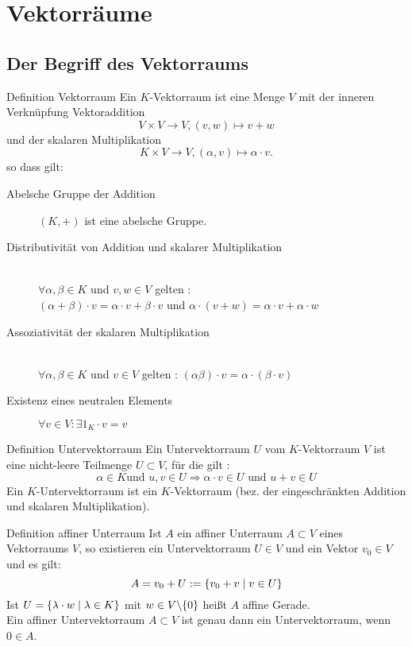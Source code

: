 \documentclass[main.tex]{subfiles}
\begin{document}
\section*{Vektorräume}
\subsection*{Der Begriff des Vektorraums}
\begin{karte}{Definition Vektorraum}
    Ein \( K \)-Vektorraum ist eine Menge \(V\) mit der inneren 
    Verknüpfung Vektoraddition 
    \[ V \times V \rightarrow V, (v,w) \mapsto v + w \]
    und der skalaren Multiplikation 
    \[ K \times V \rightarrow V, (\alpha, v) \mapsto 
    \alpha \cdot v. \]
    so dass gilt: 
    \begin{description}
        \item[Abelsche Gruppe der Addition]
        \( (K,+) \) ist eine abelsche Gruppe.  
        \item[Distributivität von Addition und skalarer Multiplikation] \hfill \\ 
        \( \forall \alpha, \beta \in K\) und \( v, w \in V\) gelten : \\
        \( (\alpha + \beta) \cdot v =  \alpha \cdot v + \beta \cdot v\)
        und 
        \( \alpha \cdot ( v + w) = \alpha \cdot v + \alpha \cdot w\)
        \item[Assoziativität der skalaren Multiplikation] \hfill \\
        \( \forall \alpha, \beta \in K\) und \( v \in V\) gelten :
        \((\alpha \beta) \cdot v = \alpha \cdot (\beta \cdot v)\)
        \item[Existenz eines neutralen Elements]
        \( \forall v \in V : \exists 1_K \cdot v = v\)
    \end{description}
\end{karte}
\begin{karte}{Definition Untervektorraum}
    Ein Untervektorraum \(U\) vom \(K\)-Vektorraum \(V\) ist eine nicht-leere
    Teilmenge \(U \subset V\), für die gilt : 
    \[\alpha \in K \text {und } u, v \in U \Rightarrow \alpha \cdot v \in U
    \text{ und } u + v \in U\]
    Ein \(K\)-Untervektorraum ist ein \(K\)-Vektorraum 
    (bez. der eingeschränkten Addition und skalaren Multiplikation).
\end{karte}
\begin{karte}{Definition affiner Unterraum}
    Ist \(A\) ein affiner Unterraum \(A \subset V\) eines Vektorraums \(V\),
    so existieren ein Untervektorraum \(U \in V\) und ein Vektor \(v_0 \in V\) 
    und es gilt: 
    \[A = v_0 + U := \{v_0 + v \;\vert\; v \in U\}\] 
    Ist \(U = \{\lambda \cdot w \;\vert\; \lambda \in K\}\) 
    mit \(w \in V \backslash \{0\}\) heißt \(A\) affine Gerade. \\
    Ein affiner Untervektorraum \(A \subset V\) ist genau dann ein Untervektorraum,
    wenn \(0 \in A\).
\end{karte}
\end{document}
